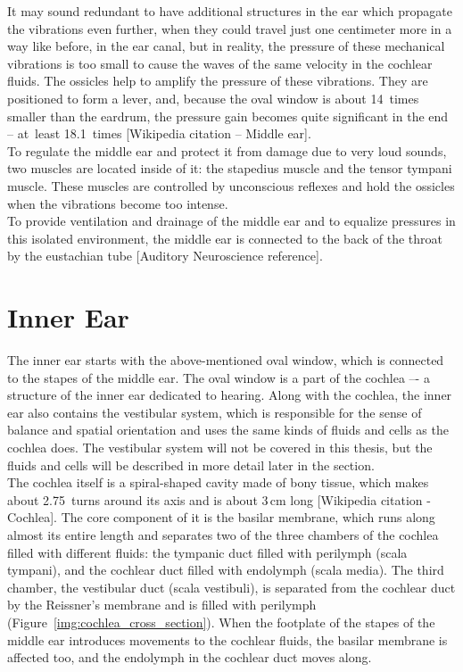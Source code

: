 It may sound redundant to have additional structures in the ear which propagate the vibrations even further, when they could travel just one centimeter more in a way like before, in the ear canal, but in reality, the pressure of these mechanical vibrations is too small to cause the waves of the same velocity in the cochlear fluids. The ossicles help to amplify the pressure of these vibrations. They are positioned to form a lever, and, because the oval window is about 14~times smaller than the eardrum, the pressure gain becomes quite significant in the end -- at~least 18.1~times [Wikipedia citation – Middle ear].\\

To regulate the middle ear and protect it from damage due to very loud sounds, two muscles are located inside of it: the stapedius muscle and the tensor tympani muscle. These muscles are controlled by unconscious reflexes and hold the ossicles when the vibrations become too intense.\\

To provide ventilation and drainage of the middle ear and to equalize pressures in this isolated environment, the middle ear is connected to the back of the throat by the eustachian tube [Auditory Neuroscience reference].

\section{Inner Ear}

The inner ear starts with the above-mentioned oval window, which is connected to the stapes of the middle ear. The oval window is a part of the cochlea –- a structure of the inner ear dedicated to hearing. Along with the cochlea, the inner ear also contains the vestibular system, which is responsible for the sense of balance and spatial orientation and uses the same kinds of fluids and cells as the cochlea does. The vestibular system will not be covered in this thesis, but the fluids and cells will be described in more detail later in the section.\\

The cochlea itself is a spiral-shaped cavity made of bony tissue, which makes about 2.75~turns around its axis and is about 3\,cm long [Wikipedia citation - Cochlea]. The core component of it is the basilar membrane, which runs along almost its entire length and separates two of the three chambers of the cochlea filled with different fluids: the tympanic duct filled with perilymph (scala tympani), and the cochlear duct filled with endolymph (scala media). The third chamber, the vestibular duct (scala vestibuli), is separated from the cochlear duct by the Reissner’s membrane and is filled with perilymph (Figure~\ref{img:cochlea_cross_section}). When the footplate of the stapes of the middle ear introduces movements to the cochlear fluids, the basilar membrane is affected too, and the endolymph in the cochlear duct moves along.\\

